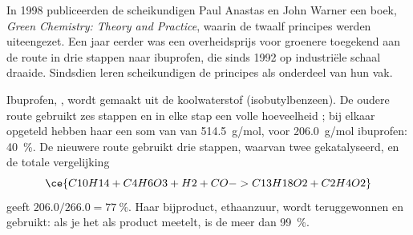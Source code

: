\begin{history}
In 1998 publiceerden de scheikundigen Paul Anastas en John Warner een
boek,
\emph{Green Chemistry: Theory and Practice}, waarin de twaalf principes
werden uiteengezet. Een jaar eerder was een overheidsprijs voor groenere
 toegekend aan de route in drie stappen naar ibuprofen, die
sinds 1992 op industriële schaal draaide. Sindsdien leren scheikundigen
de principes als onderdeel van hun vak.
\end{history}

\begin{example}\label{ex:g12:synthesis-strategy:ibuprofen}
Ibuprofen, , wordt gemaakt uit de koolwaterstof
 (isobutylbenzeen). De oudere route gebruikt zes stappen en in
elke stap een volle hoeveelheid ; bij elkaar opgeteld hebben haar
 een som van  van \qty{514.5}{g/mol}, voor
\qty{206.0}{g/mol} ibuprofen:  \qty{40}{\percent}. De
nieuwere route gebruikt drie stappen, waarvan twee gekatalyseerd, en de
totale vergelijking
\[
  \ce{C10H14 + C4H6O3 + H2 + CO -> C13H18O2 + C2H4O2}
\]
geeft $206.0/266.0 = \qty{77}{\percent}$. Haar bijproduct, ethaanzuur,
wordt teruggewonnen en gebruikt: als je het als product meetelt, is de
 meer dan
\qty{99}{\percent}.
\end{example}

